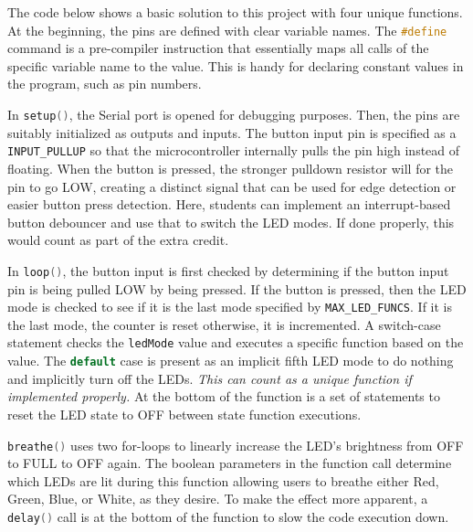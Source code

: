 \documentclass{article}
\begin{document}
    The code below shows a basic solution to this project with four unique functions. 
    At the beginning, the pins are defined with clear variable names.
    The \lstinline[language=C++, style=mystyle]{#define} command is a pre-compiler instruction that essentially maps all calls of the specific variable name to the value.
    This is handy for declaring constant values in the program, such as pin numbers.

    In \lstinline[language=C++, style=mystyle]{setup()}, the Serial port is opened for debugging purposes.
    Then, the pins are suitably initialized as outputs and inputs.
    The button input pin is specified as a \lstinline[language=C++, style=mystyle]{INPUT_PULLUP} so that the microcontroller internally pulls the pin high instead of floating.
    When the button is pressed, the stronger pulldown resistor will for the pin to go LOW, creating a distinct signal that can be used for edge detection or easier button press detection.
    Here, students can implement an interrupt-based button debouncer and use that to switch the LED modes.
    If done properly, this would count as part of the extra credit.
    
    In \lstinline[language=C++, style=mystyle]{loop()}, the button input is first checked by determining if the button input pin is being pulled LOW by being pressed.
    If the button is pressed, then the LED mode is checked to see if it is the last mode specified by \lstinline[language=C++, style=mystyle]{MAX_LED_FUNCS}.
    If it is the last mode, the counter is reset otherwise, it is incremented.
    A switch-case statement checks the \lstinline[language=C++, style=mystyle]{ledMode} value and executes a specific function based on the value. The \lstinline[language=C++, style=mystyle]{default} case is present as an implicit fifth LED mode to do nothing and implicitly turn off the LEDs. 
    \emph{This can count as a unique function if implemented properly.}
    At the bottom of the function is a set of statements to reset the LED state to OFF between state function executions.
    
    \lstinline[language=C++, style=mystyle]{breathe()} uses two for-loops to linearly increase the LED's brightness from OFF to FULL to OFF again.
    The boolean parameters in the function call determine which LEDs are lit during this function allowing users to breathe either Red, Green, Blue, or White, as they desire.
    To make the effect more apparent, a \lstinline[language=C++, style=mystyle]{delay()} call is at the bottom of the function to slow the code execution down.
\end{document}

